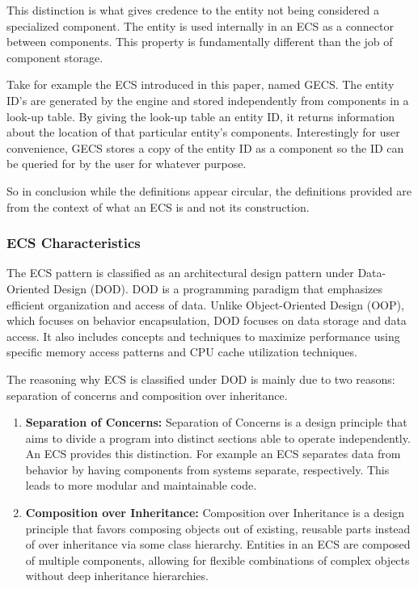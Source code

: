 This distinction is what gives credence to the entity not being considered a specialized component. The entity is used internally in an ECS as a connector between components. This property is fundamentally different than the job of component storage. 

Take for example the ECS introduced in this paper, named GECS. The entity ID's are generated by the engine and stored independently from components in a look-up table. By giving the look-up table an entity ID, it returns information about the location of that particular entity's components. Interestingly for user convenience, GECS stores a copy of the entity ID as a component so the ID can be queried for by the user for whatever purpose.

So in conclusion while the definitions appear circular, the definitions provided are from the context of what an ECS is and not its construction.

\subsubsection{ECS Characteristics}
The ECS pattern is classified as an architectural design pattern under Data-Oriented Design (DOD)\cite{RomeoPHD}. DOD is a programming paradigm that emphasizes efficient organization and access of data. Unlike Object-Oriented Design (OOP), which focuses on behavior encapsulation, DOD focuses on data storage and data access. It also includes concepts and techniques to maximize performance using specific memory access patterns and CPU cache utilization techniques.

The reasoning why ECS is classified under DOD is mainly due to two reasons: separation of concerns and composition over inheritance.

\begin{enumerate}
    \item \textbf{Separation of Concerns:} Separation of Concerns is a design principle that aims to divide a program into distinct sections able to operate independently. An ECS provides this distinction. For example an ECS separates data from behavior by having components from systems separate, respectively. This leads to more modular and maintainable code.
    \item \textbf{Composition over Inheritance: }Composition over Inheritance is a design principle that favors composing objects out of existing, reusable parts instead of over inheritance via some class hierarchy. Entities in an ECS are composed of multiple components, allowing for flexible combinations of complex objects without deep inheritance hierarchies. 
\end{enumerate}

